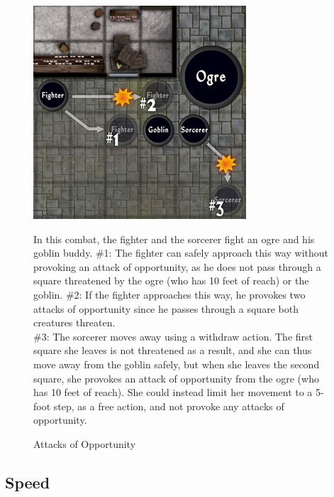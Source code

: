 \begin{figure}
\sffamily
\caption{Attacks of Opportunity}
\includegraphics[width=\linewidth]{images/AttacksOfOpportunity.jpg}

In this combat, the fighter and the sorcerer fight an ogre and his goblin buddy.\newline
\#1: The fighter can safely approach this way without provoking an attack of opportunity, as he does not pass through a square threatened by the ogre (who has 10 feet of reach) or the goblin.\newline
\#2: If the fighter approaches this way, he provokes two attacks of opportunity since he passes through a square both creatures threaten.\\
\#3: The sorcerer moves away using a withdraw action. The first square she leaves is not threatened as a result, and she can thus move away from the goblin safely, but when she leaves the second square, she provokes an attack of opportunity from the ogre (who has 10 feet of reach). She could instead limit her movement to a 5-foot step, as a free action, and not provoke any attacks of opportunity.\\
\end{figure}

				
\subsection{Speed}

